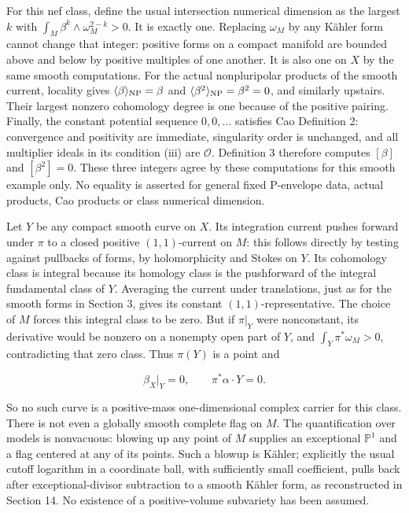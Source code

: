 \documentclass[11pt]{article}
\begin{document}
For this nef class, define the usual intersection numerical dimension as the largest $k$ with $\int_M\beta^k\wedge\omega_M^{2-k}>0$. It is exactly one. Replacing $\omega_M$ by any Kähler form cannot change that integer: positive forms on a compact manifold are bounded above and below by positive multiples of one another. It is also one on $X$ by the same smooth computations. For the actual nonpluripolar products of the smooth current, locality gives $\langle\beta\rangle_{\rm NP}=\beta$ and $\langle\beta^2\rangle_{\rm NP}=\beta^2=0$, and similarly upstairs. Their largest nonzero cohomology degree is one because of the positive pairing. Finally, the constant potential sequence $0,0,\ldots$ satisfies Cao Definition 2: convergence and positivity are immediate, singularity order is unchanged, and all multiplier ideals in its condition (iii) are $\mathcal O$. Definition 3 therefore computes $[\beta]$ and $[\beta^2]=0$. These three integers agree by these computations for this smooth example only. No equality is asserted for general fixed P-\allowbreak{}envelope data, actual products, Cao products or class numerical dimension.

Let $Y$ be any compact smooth curve on $X$. Its integration current pushes forward under $\pi$ to a closed positive $(1,1)$-\allowbreak{}current on $M$: this follows directly by testing against pullbacks of forms, by holomorphicity and Stokes on $Y$. Its cohomology class is integral because its homology class is the pushforward of the integral fundamental class of $Y$. Averaging the current under translations, just as for the smooth forms in Section 3, gives its constant $(1,1)$-\allowbreak{}representative. The choice of $M$ forces this integral class to be zero. But if $\pi|_Y$ were nonconstant, its derivative would be nonzero on a nonempty open part of $Y$, and $\int_Y\pi^*\omega_M>0$, contradicting that zero class. Thus $\pi(Y)$ is a point and

\[\beta_X|_Y=0,\qquad \pi^*\alpha\cdot Y=0.\]

So no such curve is a positive-\allowbreak{}mass one-\allowbreak{}dimensional complex carrier for this class. There is not even a globally smooth complete flag on $M$. The quantification over models is nonvacuous: blowing up any point of $M$ supplies an exceptional $\mathbb P^1$ and a flag centered at any of its points. Such a blowup is Kähler; explicitly the usual cutoff logarithm in a coordinate ball, with sufficiently small coefficient, pulls back after exceptional-\allowbreak{}divisor subtraction to a smooth Kähler form, as reconstructed in Section 14. No existence of a positive-\allowbreak{}volume subvariety has been assumed.
\end{document}
